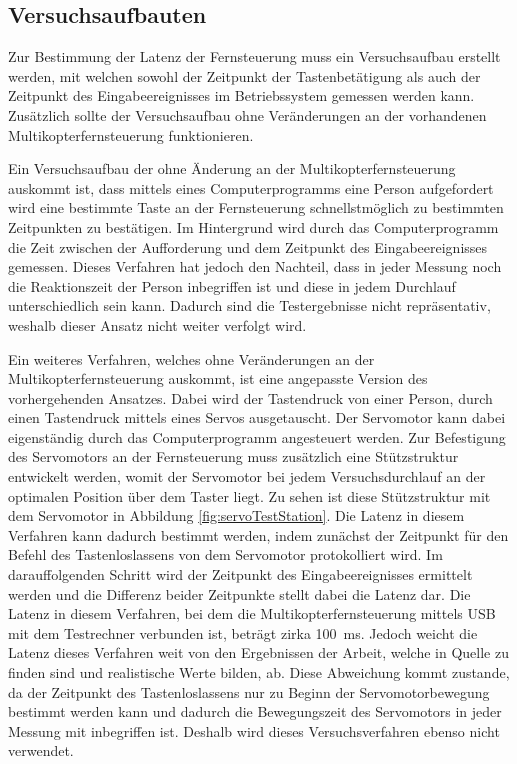 \subsection{Versuchsaufbauten}
Zur Bestimmung der Latenz der Fernsteuerung muss ein Versuchsaufbau erstellt werden, mit welchen sowohl der Zeitpunkt der Tastenbetätigung als auch der Zeitpunkt des Eingabeereignisses im Betriebssystem gemessen werden kann. Zusätzlich sollte der Versuchsaufbau ohne Veränderungen an der vorhandenen Multikopterfernsteuerung funktionieren.

Ein Versuchsaufbau der ohne Änderung an der Multikopterfernsteuerung auskommt ist, dass mittels eines Computerprogramms eine Person aufgefordert wird eine bestimmte Taste an der Fernsteuerung schnellstmöglich zu bestimmten Zeitpunkten zu bestätigen. Im Hintergrund wird durch das Computerprogramm die Zeit zwischen der Aufforderung und dem Zeitpunkt des Eingabeereignisses gemessen. Dieses Verfahren hat jedoch den Nachteil, dass in jeder Messung noch die Reaktionszeit der Person inbegriffen ist und diese in jedem Durchlauf unterschiedlich sein kann. Dadurch sind die Testergebnisse nicht repräsentativ, weshalb dieser Ansatz nicht weiter verfolgt wird.

Ein weiteres Verfahren, welches ohne Veränderungen an der Multikopterfernsteuerung auskommt, ist eine angepasste Version des vorhergehenden Ansatzes. Dabei wird der Tastendruck von einer Person, durch einen Tastendruck mittels eines Servos ausgetauscht. Der Servomotor kann dabei eigenständig durch das Computerprogramm angesteuert werden. Zur Befestigung des Servomotors an der Fernsteuerung muss zusätzlich eine Stützstruktur entwickelt werden, womit der Servomotor bei jedem Versuchsdurchlauf an der optimalen Position über dem Taster liegt. Zu sehen ist diese Stützstruktur mit dem Servomotor in Abbildung \ref{fig:servoTestStation}. Die Latenz in diesem Verfahren kann dadurch bestimmt werden, indem zunächst der Zeitpunkt für den Befehl des Tastenloslassens von dem Servomotor protokolliert wird. Im darauffolgenden Schritt wird der Zeitpunkt des Eingabeereignisses ermittelt werden und die Differenz beider Zeitpunkte stellt dabei die Latenz dar. Die Latenz in diesem Verfahren, bei dem die Multikopterfernsteuerung mittels USB mit dem Testrechner verbunden ist, beträgt zirka 100~ms. Jedoch weicht die Latenz dieses Verfahren weit von den Ergebnissen der Arbeit, welche in Quelle \cite{wimmerLatenzStation} zu finden sind und realistische Werte bilden, ab. Diese Abweichung kommt zustande, da der Zeitpunkt des Tastenloslassens nur zu Beginn der Servomotorbewegung bestimmt werden kann und dadurch die Bewegungszeit des Servomotors in jeder Messung mit inbegriffen ist. Deshalb wird dieses Versuchsverfahren ebenso nicht verwendet.


